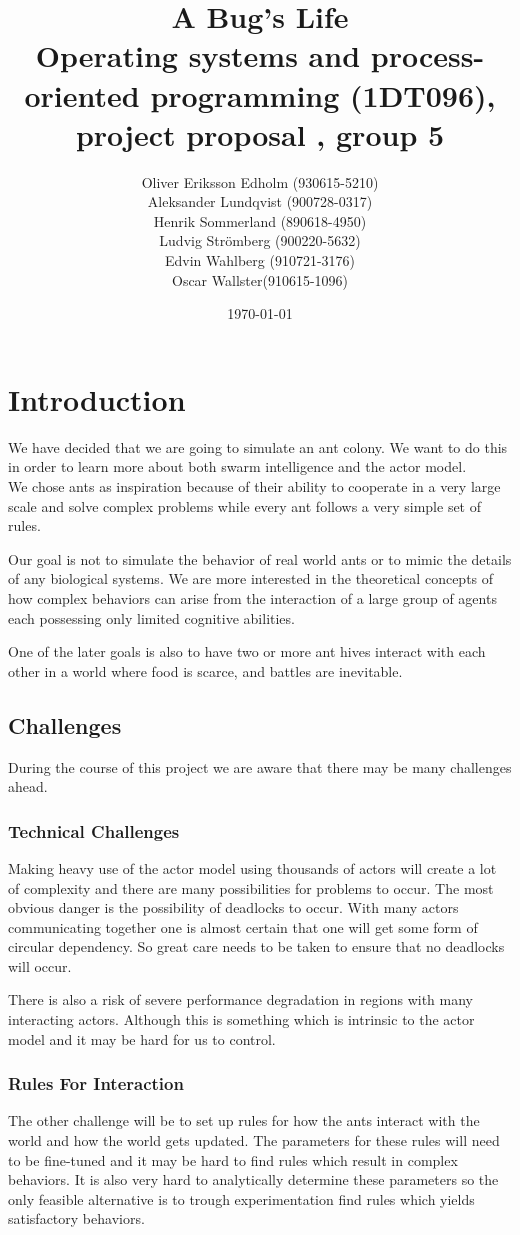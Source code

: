 \documentclass[a4paper]{article}
\title{A Bug's Life\\
 Operating systems and process-oriented programming (1DT096), project proposal
, group 5}
\date{\today}
\author{Oliver Eriksson Edholm (930615-5210) \\
Aleksander Lundqvist (900728-0317) \\
Henrik Sommerland (890618-4950) \\
Ludvig Strömberg (900220-5632) \\
Edvin Wahlberg (910721-3176) \\
Oscar Wallster(910615-1096)}
\begin{document}
\maketitle 

\section{Introduction}
We have decided that we are going to simulate an ant colony. We want to do
this in order to learn more about both swarm intelligence and the actor
model.\\
We chose ants as inspiration because of their ability to cooperate in a very large
scale and solve complex problems while every ant follows a very simple set of rules.


Our goal is not to simulate the behavior of real world ants or to mimic the
details of any biological systems.
We are more interested in the theoretical concepts of how complex behaviors can
arise from the interaction of a large group of agents each possessing only limited
cognitive abilities.


One of the later goals is also to have two or more ant hives interact with
each other in a world where food is scarce, and battles are inevitable.

\subsection{Challenges}
During the course of this project we are aware that there may be many challenges
ahead.

\subsubsection{Technical Challenges}
Making heavy use of the actor model using thousands of actors will create a lot
of complexity and there are many possibilities for problems to occur. The most
obvious danger is the possibility of deadlocks to occur. With many actors
communicating together one is almost certain that one will get some form of
circular dependency. So great care needs to be taken to ensure that no
deadlocks will occur.

There is also a risk of severe performance degradation in regions with many
interacting actors. Although this is something which is intrinsic to the actor
model and it may be hard for us to control.

\subsubsection{Rules For Interaction}
The other challenge will be to set up rules for how the ants interact with the
world and how the world gets updated. The parameters for these rules will need
to be fine-tuned and it may be hard to find rules which result in complex
behaviors. It is also very hard to analytically determine these parameters so
the only feasible alternative is to trough experimentation find rules which
yields satisfactory behaviors.
\end{document}

